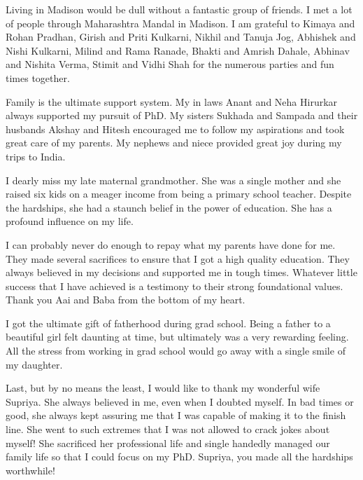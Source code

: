 Living in Madison would be dull without a fantastic group of friends.
I met a lot of people through Maharashtra Mandal in Madison. 
I am grateful to Kimaya and Rohan Pradhan, Girish and Priti Kulkarni, Nikhil and Tanuja Jog, Abhishek and Nishi Kulkarni, Milind and Rama Ranade, Bhakti and Amrish Dahale, Abhinav and Nishita Verma, Stimit and Vidhi Shah for the numerous parties and fun times together. 

Family is the ultimate support system. 
My in laws Anant and Neha Hirurkar always supported my pursuit of PhD. 
My sisters Sukhada and Sampada and their husbands Akshay and Hitesh encouraged me to follow my aspirations and took great care of my parents.
My nephews and niece provided great joy during my trips to India.

I dearly miss my late maternal grandmother. 
She was a single mother and she raised six kids on a meager income from being a primary school teacher.
Despite the hardships, she had a staunch belief in the power of education.
She has a profound influence on my life.

I can probably never do enough to repay what my parents have done for me. 
They made several sacrifices to ensure that I got a high quality education. 
They always believed in my decisions and supported me in tough times.
Whatever little success that I have achieved is a testimony to their strong foundational values.
Thank you Aai and Baba from the bottom of my heart.

I got the ultimate gift of fatherhood during grad school.
Being a father to a beautiful girl felt daunting at time, but ultimately was a very rewarding feeling.
All the stress from working in grad school would go away with a single smile of my daughter.

Last, but by no means the least, I would like to thank my wonderful wife Supriya. 
She always believed in me, even when I doubted myself. 
In bad times or good, she always kept assuring me that I was capable of making it to the finish line. 
She went to such extremes that I was not allowed to crack jokes about myself! 
She sacrificed her professional life and single handedly managed our family life so that I could focus on my PhD. 
Supriya, you made all the hardships worthwhile! 